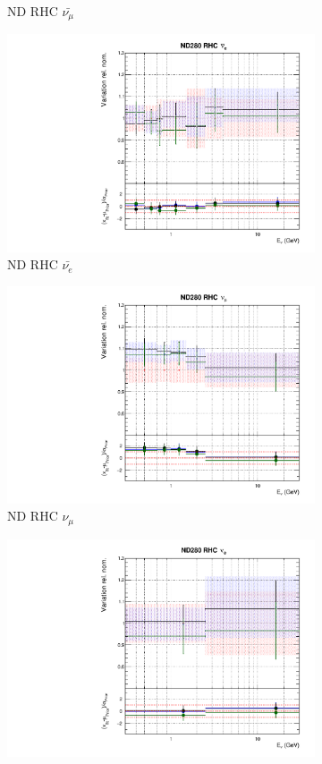 \begin{figure}
\begin{subfigure}{0.24\textwidth}
  \caption{ND RHC $\bar{\nu_{\mu}}$}
\end{subfigure}
\begin{subfigure}{0.24\textwidth}
  \centering
  \includegraphics[width=0.95\linewidth]{figs/newolddatafitsflux_5}
  \caption{ND RHC $\bar{\nu_{e}}$}
\end{subfigure}
\begin{subfigure}{0.24\textwidth}
  \centering
  \includegraphics[width=0.95\linewidth]{figs/newolddatafitsflux_6}
  \caption{ND RHC $\nu_{\mu}$}
\end{subfigure}
\vspace{15mm}
\begin{subfigure}{0.24\textwidth}
  \centering
  \includegraphics[width=0.95\linewidth]{figs/newolddatafitsflux_7}

\end{subfigure}
\end{figure}
